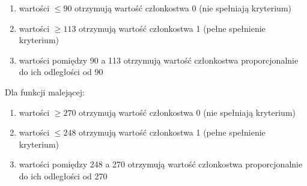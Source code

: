 \documentclass{article}
\begin{document}
\begin{enumerate}[label=•]
    \item wartości \( \leq 90 \) otrzymują wartość członkostwa 0 (nie spełniają kryterium)
    \item wartości \( \geq 113 \) otrzymują wartość członkostwa 1 (pełne spełnienie kryterium)
    \item wartości pomiędzy 90 a 113 otrzymują wartość członkostwa proporcjonalnie do ich odległości od 90
\end{enumerate}
\vspace{10pt}

Dla funkcji malejącej:
\begin{enumerate}[label=•]
    \item wartości \( \geq 270 \) otrzymują wartość członkostwa 0 (nie spełniają kryterium)
    \item wartości \( \leq 248 \) otrzymują wartość członkostwa 1 (pełne spełnienie kryterium)
    \item wartości pomiędzy 248 a 270 otrzymują wartość członkostwa proporcjonalnie do ich odległości od 270
\end{enumerate}
\vspace{10pt}
\end{document}
